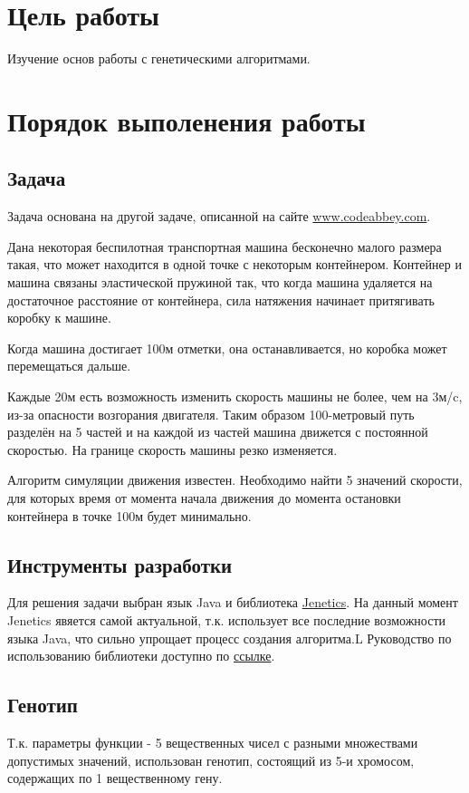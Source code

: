 \section{Цель работы}
	Изучение основ работы с генетическими алгоритмами.
\section{Порядок выполенения работы}
	\subsection{Задача}
		Задача основана на другой задаче, описанной на сайте \href{http://www.codeabbey.com/index/task_view/random-search-optimization}{www.codeabbey.com}.

		Дана некоторая беспилотная транспортная машина бесконечно малого размера такая, что может находится в одной точке с некоторым контейнером. Контейнер и машина связаны эластической пружиной так, что когда машина удаляется на достаточное расстояние от контейнера, сила натяжения начинает притягивать коробку к машине.
		
		Когда машина достигает 100м отметки, она останавливается, но коробка может перемещаться дальше.
		
		Каждые 20м есть возможность изменить скорость машины не более, чем на 3м/c, из-за опасности возгорания двигателя. Таким образом 100-метровый путь разделён на 5 частей и на каждой из частей машина движется с постоянной скоростью. На границе скорость машины резко изменяется.
		
		Алгоритм симуляции движения известен. Необходимо найти 5 значений скорости, для которых время от момента начала движения до момента остановки контейнера в точке 100м будет минимально.
		
		
	\subsection{Инструменты разработки}
		Для решения задачи выбран язык Java и библиотека \href{http://jenetics.io/}{Jenetics}.  На данный момент Jenetics явяется самой актуальной, т.к. использует все последние возможности языка Java, что сильно упрощает процесс создания алгоритма.L Руководство по использованию библиотеки доступно по \href{http://jenetics.io/manual/manual-3.6.0.pdf}{ссылке}.
		
	\subsection{Генотип}
		Т.к. параметры функции - 5 вещественных чисел с разными множествами допустимых значений, использован генотип, состоящий из 5-и хромосом, содержащих по 1 вещественному гену.
		
